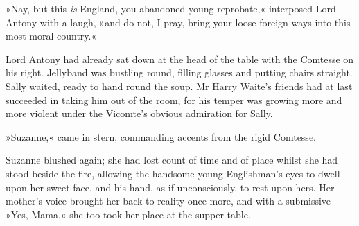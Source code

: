 »Nay, but this \textit{is} England, you abandoned young reprobate,« interposed Lord Antony with a laugh, »and do not, I pray, bring your loose foreign ways into this most moral country.«

Lord Antony had already sat down at the head of the table with the Comtesse on his right. Jellyband was bustling round, filling glasses and putting chairs straight. Sally waited, ready to hand round the soup. Mr Harry Waite's friends had at last succeeded in taking him out of the room, for his temper was growing more and more violent under the Vicomte's obvious admiration for Sally.

»Suzanne,« came in stern, commanding accents from the rigid Com\-tesse.

Suzanne blushed again; she had lost count of time and of place whilst she had stood beside the fire, allowing the handsome young Englishman's eyes to dwell upon her sweet face, and his hand, as if unconsciously, to rest upon hers. Her mother's voice brought her back to reality once more, and with a submissive »Yes, Mama,« she too took her place at the supper table.
